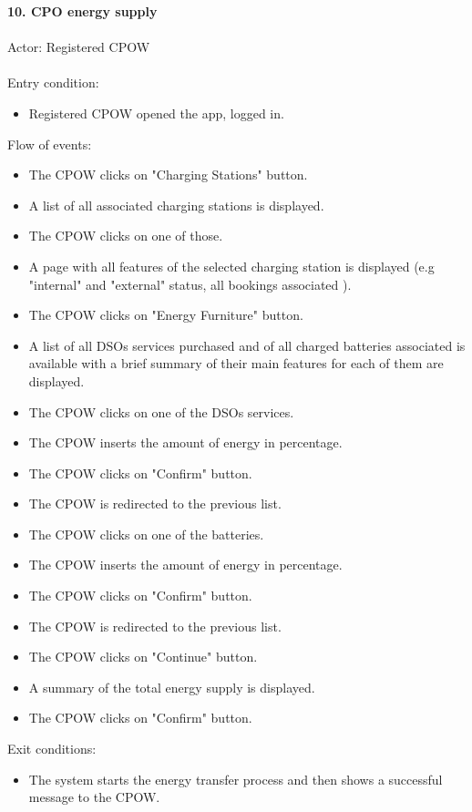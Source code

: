\documentclass[a4paper]{report}
\begin{document}
\textbf{10. CPO energy supply}\label{uc:8}
\\ \\
Actor: Registered CPOW \\ \\
Entry condition:
\begin{itemize}
\item Registered CPOW opened the app, logged in.
\end{itemize}
Flow of events:
\begin{itemize}
\item The CPOW clicks on "Charging Stations" button.
\item A list of all associated charging stations is displayed.
\item The CPOW clicks on one of those.
\item A page with all features of the selected charging station is displayed (e.g "internal" and "external" status, all bookings associated ).
\item The CPOW clicks on "Energy Furniture" button.
\item A list of all DSOs services purchased and of all charged batteries associated is available with a brief summary of their main features for each of them are displayed.
\item The CPOW clicks on one of the DSOs services.
\item The CPOW inserts the amount of energy in percentage.
\item The CPOW clicks on "Confirm" button.
\item The CPOW is redirected to the previous list.
\item The CPOW clicks on one of the batteries.
\item The CPOW inserts the amount of energy in percentage.
\item The CPOW clicks on "Confirm" button.
\item The CPOW is redirected to the previous list.
\item The CPOW clicks on "Continue" button.
\item A summary of the total energy supply is displayed.
\item The CPOW clicks on "Confirm" button.
\end{itemize}
Exit conditions:
\begin{itemize}
\item The system starts the energy transfer process and then shows a successful message to the CPOW.
\end{itemize}
\end{document}

